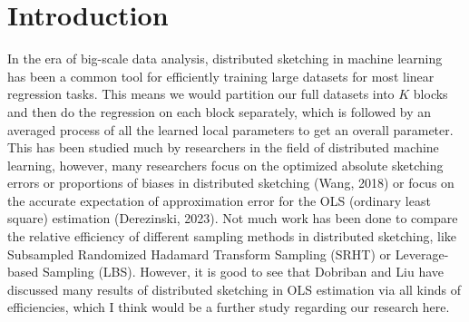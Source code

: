 \documentclass[11pt]{article}
\numberwithin{equation}{section}
\theoremstyle{plain}
\theoremstyle{definition}
\theoremstyle{remark}
\begin{document}
\section{Introduction}
In the era of big-scale data analysis, distributed sketching in machine learning has been a common tool for efficiently training large datasets for most linear regression tasks. This means we would partition our full datasets into $K$ blocks and then do the regression on each block separately, which is followed by an averaged process of all the learned local parameters to get an overall parameter.
This has been studied much by researchers in the field of distributed machine learning, however, many researchers focus on the optimized absolute sketching errors or proportions of biases in distributed sketching (Wang, 2018\cite{wang2018sketchedridgeregressionoptimization}) or focus on the accurate expectation of approximation error for the OLS (ordinary least square) estimation (Derezinski, 2023\cite{dereziński2023algorithmicgaussianizationsketchingconverting}). Not much work has been done to compare the relative efficiency of different sampling methods in distributed sketching, like Subsampled Randomized Hadamard Transform Sampling (SRHT) or Leverage-based Sampling (LBS).
However, it is good to see that Dobriban and Liu\cite{dobriban2019asymptoticssketchingsquaresregression} have discussed many results of distributed sketching in OLS estimation via all kinds of efficiencies, which I think would be a further study regarding our research here.
\end{document}
